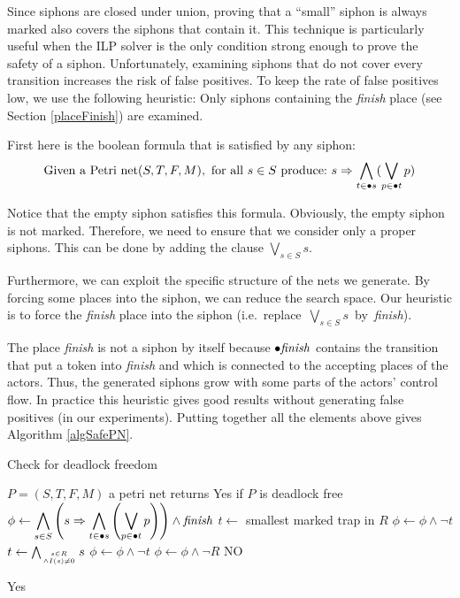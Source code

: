 \documentclass[a4paper]{report}
\numberwithin{algorithm}{chapter}
\begin{document}
Since siphons are closed under union, proving that a ``small'' siphon is always marked also covers the siphons that contain it.
This technique is particularly useful when the ILP solver is the only condition strong enough to prove the safety of a siphon.
Unfortunately, examining siphons that do not cover every transition increases the risk of false positives.
To keep the rate of false positives low, we use the following heuristic:
Only siphons containing the \emph{finish} place (see Section \ref{placeFinish}) are examined.

First here is the boolean formula that is satisfied by any siphon:
\begin{equation}
\text{Given a Petri net{}}(S,T,F,M), ~\text{for all} ~ s \in S ~ \text{produce:} ~ s \Rightarrow \bigwedge_{t \in \bullet s} (\bigvee_{p \in \bullet t} p)
\end{equation}

Notice that the empty siphon satisfies this formula.
Obviously, the empty siphon is not marked.
Therefore, we need to ensure that we consider only a proper siphons.
This can be done by adding the clause $\bigvee_{s \in S} s$.

Furthermore, we can exploit the specific structure of the nets we generate.
By forcing some places into the siphon, we can reduce the search space.
Our heuristic is to force the \emph{finish} place into the siphon (i.e.~replace~$\bigvee_{s \in S} s$~by~\emph{finish}).

The place \emph{finish} is not a siphon by itself because $\bullet \text{\emph{finish}}$ contains the transition that put a token into \emph{finish} and which is connected to the accepting places of the actors.
Thus, the generated siphons grow with some parts of the actors' control flow.
In practice this heuristic gives good results without generating false positives (in our experiments).
Putting together all the elements above gives Algorithm \ref{algSafePN}.

\begin{algorithm}
\caption{Check \pn{} for deadlock freedom}
\label{algSafePN}
\begin{algorithmic}
\REQUIRE $P = (S,T,F,M)$ a petri net %
\ENSURE returns Yes if $P$ is deadlock free %
\STATE $\phi \leftarrow \displaystyle \bigwedge_{s \in S} \left( s \Rightarrow \bigwedge_{t \in \bullet s} \left(\bigvee_{p \in \bullet t} p \right) \right) \land \text{\emph{finish}}$
\STATE $t \leftarrow $ smallest marked trap in $R$
\STATE $\phi \leftarrow \phi \land \neg t$
\STATE $t \leftarrow \bigwedge_{s \in R \atop {\land I(s) \neq 0}} s$
\STATE $\phi \leftarrow \phi \land \neg t$
\STATE $\phi \leftarrow \phi \land \neg R$
\ELSE
\RETURN NO
\ENDIF

\ENDWHILE
\RETURN Yes
\end{algorithmic}
\end{algorithm}
\end{document}
